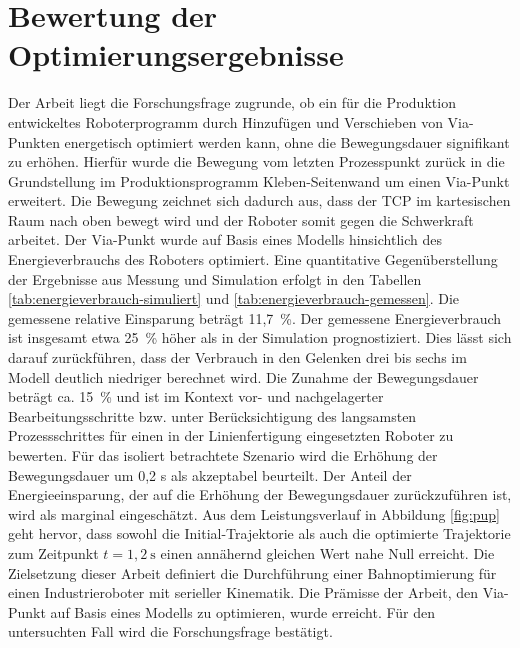 \chapter{Bewertung der Optimierungsergebnisse}
\label{cha:Bewertung}
Der Arbeit liegt die Forschungsfrage zugrunde, ob ein für die Produktion entwickeltes Roboterprogramm durch Hinzufügen und Verschieben von Via-Punkten energetisch optimiert werden kann, ohne die Bewegungsdauer signifikant zu erhöhen. Hierfür wurde die Bewegung vom letzten Prozesspunkt zurück in die Grundstellung im Produktionsprogramm  Kleben-Seitenwand  um einen Via-Punkt erweitert.  Die Bewegung zeichnet sich dadurch aus, dass der TCP im kartesischen Raum nach oben bewegt wird und der Roboter somit gegen die Schwerkraft arbeitet. Der Via-Punkt wurde auf Basis eines Modells hinsichtlich des Energieverbrauchs des Roboters optimiert. Eine quantitative Gegenüberstellung der Ergebnisse aus Messung und Simulation erfolgt in den Tabellen \ref{tab:energieverbrauch-simuliert} und \ref{tab:energieverbrauch-gemessen}. Die gemessene relative Einsparung beträgt 11,7~\%. Der gemessene Energieverbrauch ist insgesamt etwa 25~\% höher als in der Simulation prognostiziert. Dies lässt sich darauf zurückführen, dass der Verbrauch in den Gelenken drei bis sechs im Modell deutlich niedriger berechnet wird. Die Zunahme der Bewegungsdauer beträgt ca. 15~\% und ist im Kontext vor- und nachgelagerter Bearbeitungsschritte bzw. unter Berücksichtigung des langsamsten Prozessschrittes für einen in der Linienfertigung eingesetzten Roboter zu bewerten.  Für das isoliert betrachtete Szenario wird die Erhöhung der Bewegungsdauer um 0,2 s als akzeptabel beurteilt.
Der Anteil der Energieeinsparung, der auf die Erhöhung der Bewegungsdauer zurückzuführen ist, wird als marginal eingeschätzt. Aus dem Leistungsverlauf in Abbildung \ref{fig:pup} geht hervor, dass sowohl die Initial-Trajektorie als auch die optimierte Trajektorie zum Zeitpunkt $t = 1,2~\text{s}$ einen annähernd gleichen Wert nahe Null erreicht. 
%
Die Zielsetzung dieser Arbeit definiert die Durchführung einer Bahnoptimierung für einen Industrieroboter mit serieller Kinematik. Die Prämisse der Arbeit, den Via-Punkt auf Basis eines Modells zu optimieren, wurde erreicht. Für den untersuchten Fall wird die Forschungsfrage bestätigt.

